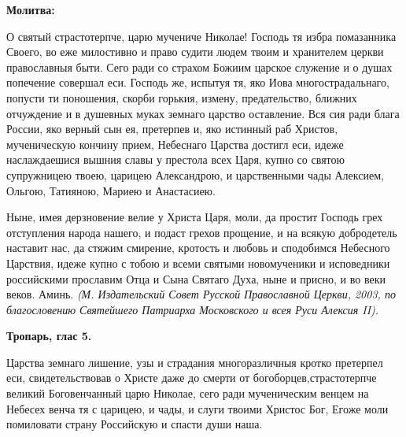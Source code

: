 \bigskip\bigskip\mychapterending

 

\bfseries Молитва:\normalfont{}


О святый страстотерпче, царю мучениче Николае! Господь тя избра помазанника Своего, во еже милостивно и право судити людем твоим и хранителем церкви православныя быти. Сего ради со страхом Божиим царское служение и о душах попечение совершал еси. Господь же, испытуя тя, яко Иова многострадальнаго, попусти ти поношения, скорби горькия, измену, предательство, ближних отчуждение и в душевных муках земнаго царство оставление. Вся сия ради блага России, яко верный сын ея, претерпев и, яко истинный раб Христов, мученическую кончину прием, Небеснаго Царства достигл еси, идеже наслаждаешися вышния славы у престола всех Царя, купно со святою супружницею твоею, царицею Александрою, и царственными чады Алексием, Ольгою, Татияною, Мариею и Анастасиею. 

Ныне, имея дерзновение велие у Христа Царя, моли, да простит Господь грех отступления народа нашего, и подаст грехов прощение, и на всякую добродетель наставит нас, да стяжим смирение, кротость и любовь и сподобимся Небесного Царствия, идеже купно с тобою и всеми святыми новомученики и исповедники российскими прославим Отца и Сына Святаго Духа, ныне и присно, и во веки веков. Аминь.\itshape \normalfont{}
(М. Издательский Совет Русской Православной Церкви, 2003, по благословению Святейшего Патриарха Московского и всея Руси Алексия II).

\bigskip\bigskip\mychapterending

 


\bfseries Тропарь, глас 5.\normalfont{}\bfseries 


Царства земнаго лишение, узы и страдания многоразличныя кротко претерпел еси, свидетельствовав о Христе даже до смерти от богоборцев,страстотерпче великий Боговенчанный царю Николае, сего ради мученическим венцем на Небесех венча тя с царицею, и чады, и слуги твоими Христос Бог, Егоже моли помиловати страну Российскую и спасти души наша.\normalfont{}


\bigskip\bigskip\mychapterending

